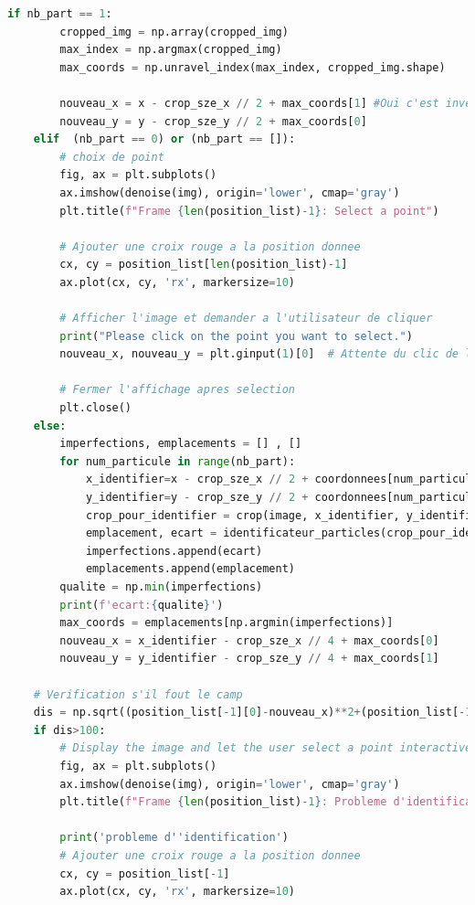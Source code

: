 \documentclass[11pt,letterpaper]{article}
\begin{document}
\begin{lstlisting}[language=python]
    if nb_part == 1:
        cropped_img = np.array(cropped_img)
        max_index = np.argmax(cropped_img)
        max_coords = np.unravel_index(max_index, cropped_img.shape)

        nouveau_x = x - crop_sze_x // 2 + max_coords[1] #Oui c'est inverse a cause du unravel juste avant
        nouveau_y = y - crop_sze_y // 2 + max_coords[0]
    elif  (nb_part == 0) or (nb_part == []):
        # choix de point
        fig, ax = plt.subplots()
        ax.imshow(denoise(img), origin='lower', cmap='gray') 
        plt.title(f"Frame {len(position_list)-1}: Select a point")

        # Ajouter une croix rouge a la position donnee
        cx, cy = position_list[len(position_list)-1]
        ax.plot(cx, cy, 'rx', markersize=10) 
        
        # Afficher l'image et demander a l'utilisateur de cliquer
        print("Please click on the point you want to select.")
        nouveau_x, nouveau_y = plt.ginput(1)[0]  # Attente du clic de l'utilisateur (1 point)
        
        # Fermer l'affichage apres selection
        plt.close()
    else:
        imperfections, emplacements = [] , []
        for num_particule in range(nb_part):
            x_identifier=x - crop_sze_x // 2 + coordonnees[num_particule][0]
            y_identifier=y - crop_sze_y // 2 + coordonnees[num_particule][1]
            crop_pour_identifier = crop(image, x_identifier, y_identifier, crop_sze_x//2, crop_sze_x//2)
            emplacement, ecart = identificateur_particles(crop_pour_identifier, taille_initiale, luminosite_initiale, seuil)
            imperfections.append(ecart)
            emplacements.append(emplacement)
        qualite = np.min(imperfections)
        print(f'ecart:{qualite}')
        max_coords = emplacements[np.argmin(imperfections)]  
        nouveau_x = x_identifier - crop_sze_x // 4 + max_coords[0]
        nouveau_y = y_identifier - crop_sze_y // 4 + max_coords[1]
    
    # Verification s'il fout le camp 
    dis = np.sqrt((position_list[-1][0]-nouveau_x)**2+(position_list[-1][1]-nouveau_y)**2)
    if dis>100:
        # Display the image and let the user select a point interactively
        fig, ax = plt.subplots()
        ax.imshow(denoise(img), origin='lower', cmap='gray') 
        plt.title(f"Frame {len(position_list)-1}: Probleme d'identification, nouvelle pos a {dis}, select a point")

        print('probleme d''identification')
        # Ajouter une croix rouge a la position donnee
        cx, cy = position_list[-1]
        ax.plot(cx, cy, 'rx', markersize=10) 
        

\end{lstlisting}
\end{document}
